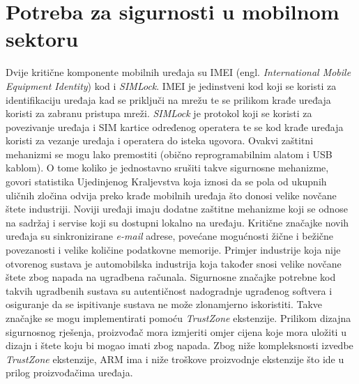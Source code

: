 \documentclass[times, utf8, diplomski, numeric]{fer}
\begin{document}
\section{Potreba za sigurnosti u mobilnom sektoru}
Dvije kritične komponente mobilnih uređaja su IMEI (engl. \textit{International Mobile Equipment Identity}) kod i
\textit{SIMLock}. IMEI je jedinstveni kod koji se koristi za identifikaciju uređaja kad se priključi na mrežu te se prilikom
krađe uređaja koristi za zabranu pristupa mreži. \textit{SIMLock} je protokol koji se koristi za povezivanje uređaja i
SIM kartice određenog operatera te se kod krađe uređaja koristi za vezanje uređaja i operatera do isteka ugovora. Ovakvi
zaštitni mehanizmi se mogu lako premostiti (obično reprogramabilnim alatom i USB kablom). O tome koliko je jednostavno
srušiti takve sigurnosne mehanizme, govori statistika Ujedinjenog Kraljevstva koja iznosi da se pola od ukupnih uličnih
zločina odvija preko krađe mobilnih uređaja što donosi velike novčane štete industriji. Noviji uređaji imaju dodatne
zaštitne mehanizme koji se odnose na sadržaj i servise koji su dostupni lokalno na uređaju. Kritične značajke novih
uređaja su sinkronizirane \textit{e-mail} adrese, povećane mogućnosti žične i bežične povezanosti i velike količine
podatkovne memorije. Primjer industrije koja nije otvorenog sustava je automobilska industrija koja također snosi velike
novčane štete zbog napada na ugradbena računala. Sigurnosne značajke potrebne kod takvih ugradbenih sustava su autentičnost
nadogradnje ugrađenog softvera i osiguranje da se ispitivanje sustava ne može zlonamjerno iskoristiti.
Takve značajke se mogu implementirati pomoću \textit{TrustZone} ekstenzije. Prilikom dizajna sigurnosnog rješenja, proizvođač
mora izmjeriti omjer cijena koje mora uložiti u dizajn i štete koju bi mogao imati zbog napada. Zbog niže kompleksnosti
izvedbe \textit{TrustZone} ekstenzije, ARM ima i niže troškove proizvodnje ekstenzije što ide u prilog proizvođačima
uređaja.
\end{document}
